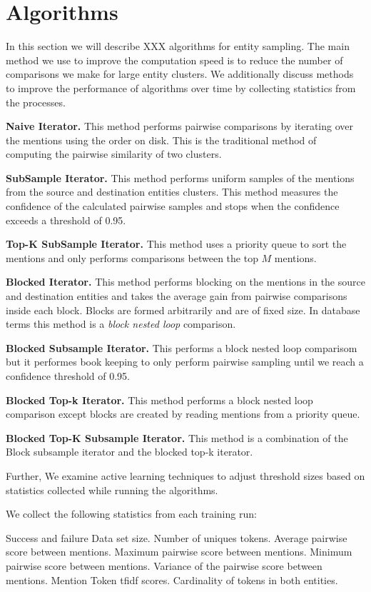 
\section{Algorithms}

In this section we will describe XXX algorithms for entity sampling.
The main method we use to improve the computation speed is to reduce the
number of comparisons we make for large entity clusters.
We additionally discuss methods to improve the performance of algorithms
over time by collecting statistics from the processes.

\textbf{Naive Iterator.} This method performs pairwise comparisons by 
iterating over the mentions using the order on disk. This is the traditional
method of computing the pairwise similarity of two clusters. 

\textbf{SubSample Iterator.} This method performs uniform samples of the
mentions from the source and destination entities clusters. This method
measures the confidence of the calculated pairwise samples and stops when the
confidence exceeds a threshold of 0.95.

\textbf{Top-K SubSample Iterator.} This method uses a priority queue to sort
the mentions and only performs comparisons between the top $M$ mentions.

\textbf{Blocked Iterator.} This method performs blocking on the mentions in the
source and destination entities and takes the average gain from pairwise
comparisons inside each block. Blocks are formed arbitrarily and are of fixed
size. In database terms this method is a \emph{block nested loop} comparison.

\textbf{Blocked Subsample Iterator.} This performs a block nested loop
comparisom but it performes book keeping to only perform pairwise sampling
until we reach a confidence threshold of 0.95.

\textbf{Blocked Top-k Iterator.} This method performs a block nested loop
comparison except blocks are created by reading mentions from a priority queue.

\textbf{Blocked Top-K Subsample Iterator.} This method is a combination of the
Block subsample iterator and the blocked top-k iterator.

Further, We examine active learning techniques to adjust threshold sizes based
on statistics collected while running the algorithms.

We collect the following statistics from each training run:

Success and failure
Data set size.
Number of uniques tokens.
Average pairwise score between mentions.
Maximum pairwise score between mentions.
Minimum pairwise score between mentions.
Variance of the pairwise score between mentions.
Mention Token tfidf scores.
Cardinality of tokens in both entities.

